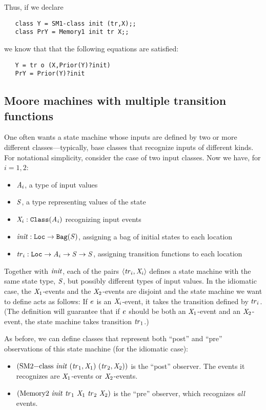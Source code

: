\documentclass[final]{article}
\newcommand{\listinline}[1]{\text{\lstinline{#1}}}
\begin{document}
Thus, if we declare
\begin{lstlisting}
   class Y = SM1-class init (tr,X);;
   class PrY = Memory1 init tr X;;
\end{lstlisting}
we know that that the following equations are satisfied:
\begin{lstlisting}
   Y = tr o (X,Prior(Y)?init)
   PrY = Prior(Y)?init
\end{lstlisting}

\subsection{Moore machines with multiple transition
  functions}\label{sec:SM2-Memory2}

One often wants a state machine whose inputs are defined by two or
more different classes---typically, base classes that recognize inputs
of different kinds.  For notational simplicity, consider the case of
two input classes.  Now we have, for $i = 1,2$:
\begin{itemize}
\item $\mathit{A}_i$, a type of input values
\item $\mathit{S}$, a type representing values of the state
\item $\mathit{X}_i:\mathtt{Class}(\mathit{A_i})$ recognizing input events
\item $\mathit{init} : \mathtt{Loc}\rightarrow\mathtt{Bag}(\mathit{S})$,
  assigning a bag of initial states to each location
\item
  $\mathit{tr}_i : \mathtt{Loc}\rightarrow\mathit{A}_i\rightarrow\mathit{S}\rightarrow\mathit{S}$,
  assigning transition functions to each location
\end{itemize}

Together with $\mathit{init}$, each of the pairs
$\langle\mathit{tr}_i,\mathit{X}_i\rangle$ defines a state machine with
the same state type, $\mathit{S}$, but possibly different types of
input values.  In the idiomatic case, the $\mathit{X}_1$-events and the
$\mathit{X}_2$-events are disjoint and the state machine we want to
define acts as follows: If $\mathit{e}$ is an $\mathit{X}_i$-event, it
takes the transition defined by $\mathit{tr}_i$.  (The definition will
guarantee that if $\mathit{e}$ should be both an $\mathit{X}_1$-event
and an $\mathit{X}_2$-event, the state machine takes transition
$\mathit{tr}_1$.)

As before, we can define classes that represent both ``post'' and
``pre'' observations of this state machine (for the idiomatic case):
\begin{itemize}
\item
$(\listinline{SM2-class}~\NUPRL{init}~(\NUPRL{tr}_1,\NUPRL{X}_1)~(\NUPRL{tr}_2,\NUPRL{X}_2))$ is the
``post'' observer.
  The events it recognizes are $\mathit{X}_1$-events or
  $\mathit{X}_2$-events.

\item
$(\listinline{Memory2}~\NUPRL{init}~\NUPRL{tr}_1~\NUPRL{X}_1~\NUPRL{tr}_2~\NUPRL{X}_2)$ is the
``pre'' observer, which recognizes \emph{all} events.
\end{itemize}
\end{document}
